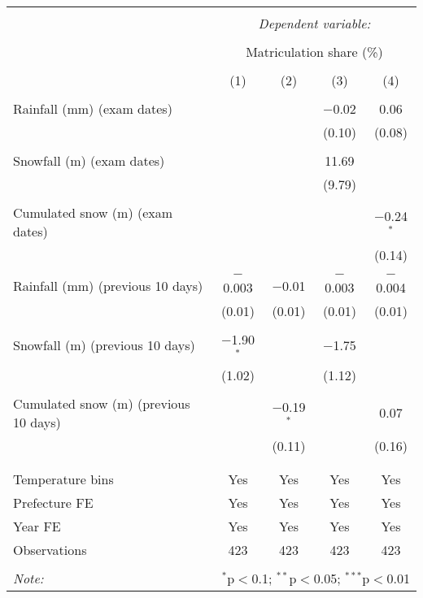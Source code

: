 
\begin{tabular}{@{\extracolsep{5pt}}lcccc} 
\\[-1.8ex]\hline 
\hline \\[-1.8ex] 
 & \multicolumn{4}{c}{\textit{Dependent variable:}} \\ 
\cline{2-5} 
\\[-1.8ex] & \multicolumn{4}{c}{Matriculation share (\%)} \\ 
\\[-1.8ex] & (1) & (2) & (3) & (4)\\ 
\hline \\[-1.8ex] 
 Rainfall (mm) (exam dates) &  &  & $-$0.02 & 0.06 \\ 
  &  &  & (0.10) & (0.08) \\ 
  & & & & \\ 
 Snowfall (m) (exam dates) &  &  & 11.69 &  \\ 
  &  &  & (9.79) &  \\ 
  & & & & \\ 
 Cumulated snow (m) (exam dates) &  &  &  & $-$0.24$^{*}$ \\ 
  &  &  &  & (0.14) \\ 
  & & & & \\ 
 Rainfall (mm) (previous 10 days) & $-$0.003 & $-$0.01 & $-$0.003 & $-$0.004 \\ 
  & (0.01) & (0.01) & (0.01) & (0.01) \\ 
  & & & & \\ 
 Snowfall (m) (previous 10 days) & $-$1.90$^{*}$ &  & $-$1.75 &  \\ 
  & (1.02) &  & (1.12) &  \\ 
  & & & & \\ 
 Cumulated snow (m) (previous 10 days) &  & $-$0.19$^{*}$ &  & 0.07 \\ 
  &  & (0.11) &  & (0.16) \\ 
  & & & & \\ 
\hline \\[-1.8ex] 
Temperature bins & Yes & Yes & Yes & Yes \\ 
Prefecture FE & Yes & Yes & Yes & Yes \\ 
Year FE & Yes & Yes & Yes & Yes \\ 
Observations & 423 & 423 & 423 & 423 \\ 
\hline 
\hline \\[-1.8ex] 
\textit{Note:}  & \multicolumn{4}{r}{$^{*}$p$<$0.1; $^{**}$p$<$0.05; $^{***}$p$<$0.01} \\ 
\end{tabular} 
